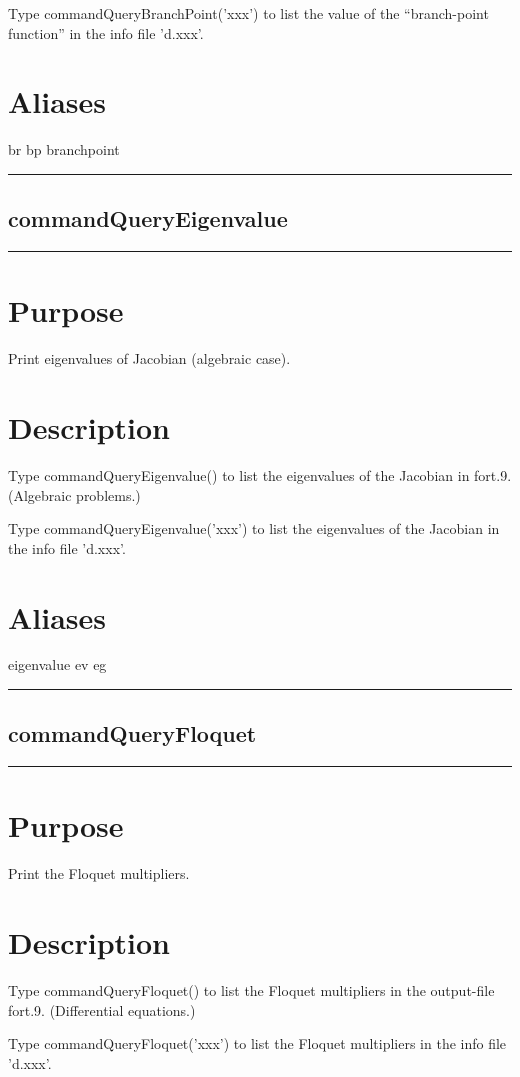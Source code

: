\documentclass[12pt]{report}
\begin{document}
\begin{minipage}{6in}
    Type commandQueryBranchPoint('xxx') to list the value of the ``branch-point function''
    in the info file 'd.xxx'.
    \section*{Aliases}
br bp branchpoint \medskip\hrule\end{minipage}\subsection{commandQueryEigenvalue} \label{sec:clui_ref_commandQueryEigenvalue}\begin{minipage}{6in}\hrule\medskip\section*{Purpose}
Print eigenvalues of Jacobian (algebraic case).\section*{Description}

    Type commandQueryEigenvalue() to list the eigenvalues of the Jacobian 
    in fort.9. 
    (Algebraic problems.)

    Type commandQueryEigenvalue('xxx') to list the eigenvalues of the Jacobian 
    in the info file 'd.xxx'.
    \section*{Aliases}
eigenvalue ev eg \medskip\hrule\end{minipage}\subsection{commandQueryFloquet} \label{sec:clui_ref_commandQueryFloquet}\begin{minipage}{6in}\hrule\medskip\section*{Purpose}
Print the Floquet multipliers.\section*{Description}

    Type commandQueryFloquet() to list the Floquet multipliers
    in the output-file fort.9. 
    (Differential equations.)

    Type commandQueryFloquet('xxx') to list the Floquet multipliers 
    in the info file 'd.xxx'.

\end{minipage}
\end{document}
